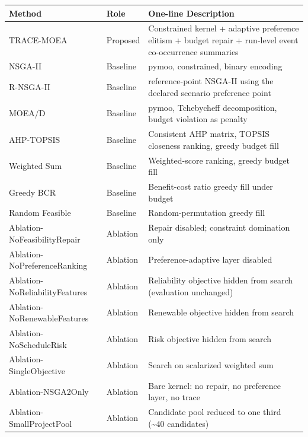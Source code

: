 \documentclass[
  10pt,
  a4paper,
]{article}
\begin{document}
\begin{longtable}[]{@{}
  >{\raggedright\arraybackslash}p{}
  >{\raggedright\arraybackslash}p{}
  >{\raggedright\arraybackslash}p{}@{}}
\toprule\noalign{}
\begin{minipage}[b]{\linewidth}\raggedright
Method
\end{minipage} & \begin{minipage}[b]{\linewidth}\raggedright
Role
\end{minipage} & \begin{minipage}[b]{\linewidth}\raggedright
One-line Description
\end{minipage} \\
\midrule\noalign{}
\endhead
\bottomrule\noalign{}
\endlastfoot
TRACE-MOEA & Proposed & Constrained kernel + adaptive preference elitism
+ budget repair + run-level event co-occurrence summaries \\
NSGA-II & Baseline & pymoo, constrained, binary encoding \\
R-NSGA-II & Baseline & reference-point NSGA-II using the declared
scenario preference point \\
MOEA/D & Baseline & pymoo, Tchebycheff decomposition, budget violation
as penalty \\
AHP-TOPSIS & Baseline & Consistent AHP matrix, TOPSIS closeness ranking,
greedy budget fill \\
Weighted Sum & Baseline & Weighted-score ranking, greedy budget fill \\
Greedy BCR & Baseline & Benefit-cost ratio greedy fill under budget \\
Random Feasible & Baseline & Random-permutation greedy fill \\
Ablation-NoFeasibilityRepair & Ablation & Repair disabled; constraint
domination only \\
Ablation-NoPreferenceRanking & Ablation & Preference-adaptive layer
disabled \\
Ablation-NoReliabilityFeatures & Ablation & Reliability objective hidden
from search (evaluation unchanged) \\
Ablation-NoRenewableFeatures & Ablation & Renewable objective hidden
from search \\
Ablation-NoScheduleRisk & Ablation & Risk objective hidden from
search \\
Ablation-SingleObjective & Ablation & Search on scalarized weighted
sum \\
Ablation-NSGA2Only & Ablation & Bare kernel: no repair, no preference
layer, no trace \\
Ablation-SmallProjectPool & Ablation & Candidate pool reduced to one
third (\textasciitilde40 candidates) \\
\end{longtable}
\end{document}
